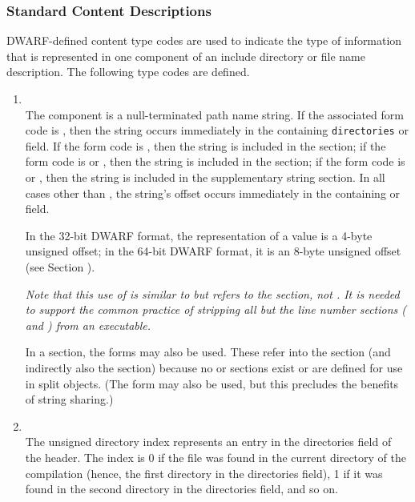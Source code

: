 \subsubsection{Standard Content Descriptions}
\label{chap:standardcontentdescriptions}
DWARF-defined content type codes are used to indicate
the type of information that is represented in one
component of an include directory or file name description.
The following type codes are defined.
\begin{enumerate}[1. ]

\item  \DWLNCTpathTARG \\
The component is a null-terminated path name string.
If the associated form code is \DWFORMstring{}, then the
string occurs immediately in the containing \texttt{directories}
or  field. 
\bb
If the form code is \DWFORMlinestrp, then the string is included in
the \dotdebuglinestr{} section; if the form code is \DWFORMstrp{} or
\DWFORMstrpeight, then the string is included in the \dotdebugstr{} section;
if the form code is \DWFORMstrpsup{} or \DWFORMstrpsupeight, then the
string is included in the supplementary string section. In all cases
other than \DWFORMstring, the string's offset
\eb
occurs immediately in the containing
\HFNdirectories{} or \HFNfilenames{} field.


In the 32-bit DWARF format, the representation of a
\DWFORMlinestrp{} value is a 4-byte unsigned offset; in the
64-bit DWARF format, it is an 8-byte unsigned offset (see
Section ).

\textit{Note that this use of \DWFORMlinestrp{} is similar to
\DWFORMstrp{} but refers to the \dotdebuglinestr{} section,
not \dotdebugstr. 
It is needed to support the common practice of stripping all but 
the line number sections (\dotdebugline{} and \dotdebuglinestr{}) 
from an executable.
}

In a \dotdebuglinedwo{} section, the forms \DWFORMstrxXNand{} may
also be used. These refer into the \dotdebugstroffsetsdwo{}
section (and indirectly also the \dotdebugstrdwo{} section)
because no 
\bb
{} or 
\eb
sections exist or are defined for 
use in split objects. (The form \DWFORMstring{} may also be used, 
but this precludes the benefits of string sharing.)
   
\item \DWLNCTdirectoryindexTARG \\
The unsigned directory index represents an entry in the
directories field of the header. The index is 0 if
the file was found in the current directory of the compilation
(hence, the first directory in the directories field),
1 if it was found in the second directory in the directories
field, and so on.


\end{enumerate}
